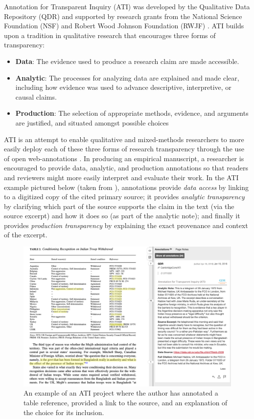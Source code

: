 \documentclass[sigchi]{acmart}
\begin{document}
Annotation for Transparent Inquiry (ATI) was developed by the Qualitative Data Repository (QDR) and supported by research grants from the National Science Foundation (NSF) and Robert Wood Johnson Foundation (RWJF) \cite{elman2018qualitative}. ATI builds upon a tradition in qualitative research that encourages three forms of transparency: 
\begin{itemize}
    \item \textbf{Data}: The evidence used to produce a research claim are made accessible. 
    \item \textbf{Analytic}: The processes for analyzing data are explained and made clear, including how evidence was used to advance descriptive, interpretive, or causal claims. 
    \item \textbf{Production}: The selection of appropriate methods, evidence, and arguments are justified, and situated amongst possible choices \cite{moravcsik2014transparency}  
\end{itemize}
ATI is an attempt to enable qualitative and mixed-methods researchers to more easily deploy each of these three forms of research transparency through the use of open web-annotations \cite{karcher2019annotation}. In producing an empirical manuscript, a researcher is encouraged to provide data, analytic, and production annotations so that readers and reviewers might more easily interpret and evaluate their work. In the ATI example pictured below (taken from \cite{omahoney_data_2019}), annotations provide \textit{data access} by linking to a digitized copy of the cited primary source; it provides \textit{analytic transparency} by clarifying which part of the source supports the claim in the text (via the source excerpt) and how it does so (as part of the analytic note); and finally it provides  \textit{production transparency} by explaining the exact provenance and context of the excerpt.

\begin{figure}[tb]
\centering
\includegraphics[width=\textwidth]{ATI.png}
\caption{An example of an ATI project where the author has annotated a table reference, provided a link to the source, and an explanation of the choice for its inclusion.}
\end{figure}
\end{document}
